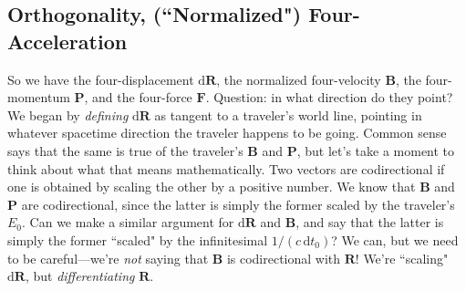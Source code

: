 \documentclass[12pt]{article}
\renewcommand{\vv}[1]{\mathbf{#1}}
\newcommand{\dd}[1]{\mathrm{d}#1}
\begin{document}
\subsection[Orthogonality, ("Normalized") Four-Acceleration]{Orthogonality, (``Normalized") Four-Acceleration}

So we have the four-displacement $\dd \vv R$, the normalized four-velocity $\vv B$, the four-momentum $\vv P$, and the four-force $\vv F$. Question: in what direction do they point? We began by \emph{defining} $\dd \vv R$ as tangent to a traveler's world line, pointing in whatever spacetime direction the traveler happens to be going. Common sense says that the same is true of the traveler's $\vv B$ and $\vv P$, but let's take a moment to think about what that means mathematically. Two vectors are codirectional if one is obtained by scaling the other by a positive number. We know that $\vv B$ and $\vv P$ are codirectional, since the latter is simply the former scaled by the traveler's $E_0$. Can we make a similar argument for $\dd \vv R$ and $\vv B$, and say that the latter is simply the former ``scaled" by the infinitesimal $1/(c \, \dd t_0)$? We can, but we need to be careful---we're \emph{not} saying that $\vv B$ is codirectional with $\vv R$! We're ``scaling" $\dd \vv R$, but \emph{differentiating} $\vv R$.
\end{document}
